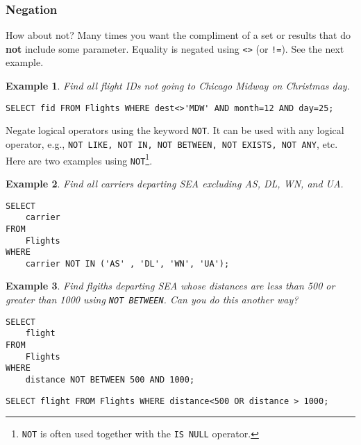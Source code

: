 \documentclass{article}
\newtheorem{example}{Example}
\begin{document}
\subsubsection*{Negation}
How about not?  Many times you want the compliment of a set or results that
do \textbf{not} include some parameter.  Equality is negated using \texttt{<>}
(or \texttt{!=}).   See the next example.





\begin{example}
Find all flight IDs not going to Chicago Midway on Christmas day.    
\end{example}


\begin{lstlisting}[frame=single]  
SELECT fid FROM Flights WHERE dest<>'MDW' AND month=12 AND day=25;
\end{lstlisting} 



\noindent Negate logical operators using the keyword \texttt{NOT}.  It can be used with any logical operator, e.g., \texttt{NOT LIKE, NOT IN, NOT BETWEEN, NOT\ EXISTS, NOT\ ANY}, etc.  Here are two examples using \texttt{NOT}\footnote{\texttt{NOT} is often used together with the \texttt{IS NULL} operator.}. 

\begin{example}
Find all carriers departing SEA excluding AS, DL, WN, and UA.   
\end{example}


\begin{lstlisting}[frame=single]  
SELECT 
    carrier
FROM
    Flights
WHERE
    carrier NOT IN ('AS' , 'DL', 'WN', 'UA'); 
\end{lstlisting} 







\begin{example}
Find flgiths departing SEA whose distances are less than 500 or greater than 1000 using \texttt{NOT BETWEEN}.  Can you do this another way?     
\end{example}


\begin{lstlisting}[frame=single]  
SELECT 
    flight
FROM
    Flights
WHERE
    distance NOT BETWEEN 500 AND 1000; 
\end{lstlisting} 




\begin{lstlisting}[frame=single]  
SELECT flight FROM Flights WHERE distance<500 OR distance > 1000; 
\end{lstlisting} 
\end{document}
